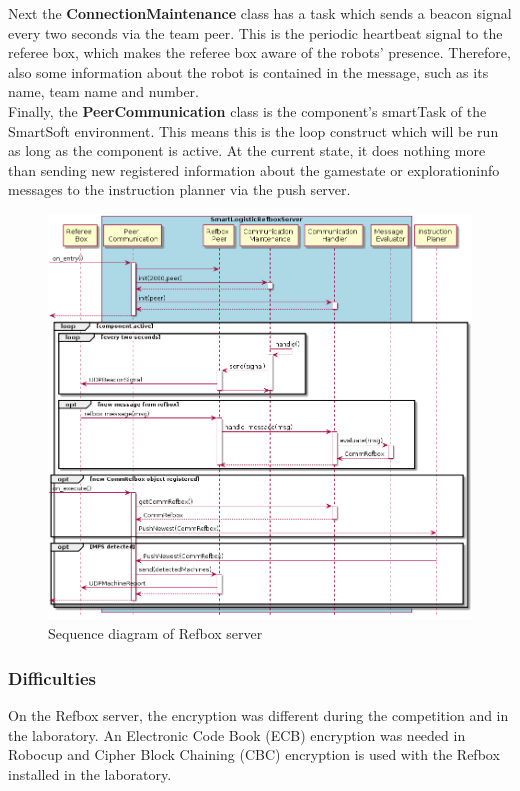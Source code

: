 Next the \textbf{ConnectionMaintenance} class has a task which sends a beacon signal every two seconds via the team peer. This is the periodic heartbeat signal to the referee box, which makes the referee box aware of the robots’ presence. Therefore, also some information about the robot is contained in the message, such as its name, team name and number.\\

Finally, the \textbf{PeerCommunication} class is the component’s smartTask of the SmartSoft environment. This means this is the loop construct which will be run as long as the component is active. At the current state, it does nothing more than sending new registered information about the gamestate or explorationinfo messages to the instruction planner via the push server.\\

\begin{figure}[!h]
\centering
\includegraphics[width=\linewidth]{pic/sequence_diagram_RefboxServer.png}
\caption{Sequence diagram of Refbox server \cite{BOK}}
\label{fig:sequenceDiagramRefboxServer}
\end{figure}


\subsubsection{Difficulties}

On the Refbox server, the encryption was different during the competition and in the laboratory. An Electronic Code Book (ECB) encryption was needed in Robocup and Cipher Block Chaining (CBC) encryption is used with the Refbox installed in the laboratory. \\